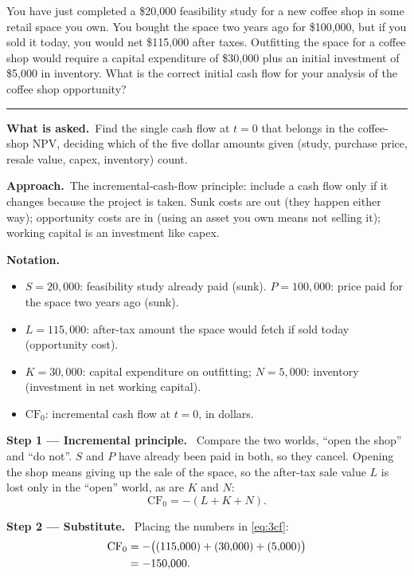 \documentclass[11pt,a4paper]{article}
\numberwithin{equation}{section}
\newcommand{\step}[2]{\par\medskip\noindent\textbf{Step #1 --- #2.}~}
\newenvironment{notation}{\par\noindent\textbf{Notation.}\begin{itemize}[leftmargin=1.4em]}{\end{itemize}}
\newcommand{\asked}{\par\medskip\noindent\textbf{What is asked.}~}
\newcommand{\approach}{\par\smallskip\noindent\textbf{Approach.}~}
\newcommand{\stmtend}{\par\endgroup\nopagebreak\noindent\rule{\linewidth}{0.4pt}\par\medskip}
\begin{document}
You have just completed a \$20,000 feasibility study for a new coffee shop in some retail space you
own. You bought the space two years ago for \$100,000, but if you sold it today, you would net
\$115,000 after taxes. Outfitting the space for a coffee shop would require a capital expenditure of
\$30,000 plus an initial investment of \$5,000 in inventory. What is the correct initial cash flow
for your analysis of the coffee shop opportunity?
\stmtend

\asked Find the single cash flow at $t=0$ that belongs in the coffee-shop NPV, deciding which of
the five dollar amounts given (study, purchase price, resale value, capex, inventory) count.

\approach The incremental-cash-flow principle: include a cash flow only if it changes because
the project is taken. Sunk costs are out (they happen either way); opportunity costs are in
(using an asset you own means not selling it); working capital is an investment like capex.

\begin{notation}
  \item $S=20{,}000$: feasibility study already paid (sunk). $P=100{,}000$: price paid for the space two years ago (sunk).
  \item $L=115{,}000$: after-tax amount the space would fetch if sold today (opportunity cost).
  \item $K=30{,}000$: capital expenditure on outfitting; $N=5{,}000$: inventory (investment in net working capital).
  \item $\mathrm{CF}_0$: incremental cash flow at $t=0$, in dollars.
\end{notation}

\step{1}{Incremental principle} Compare the two worlds, ``open the shop'' and ``do not''. $S$ and
$P$ have already been paid in both, so they cancel. Opening the shop means giving up the sale of
the space, so the after-tax sale value $L$ is lost only in the ``open'' world, as are $K$ and $N$:
\begin{equation}\label{eq:3cf}
  \mathrm{CF}_0 = -(L + K + N).
\end{equation}

\step{2}{Substitute} Placing the numbers in \eqref{eq:3cf}:
\begin{align}
  \mathrm{CF}_0 &= -\big((115{,}000) + (30{,}000) + (5{,}000)\big) \notag\\
                &= -150{,}000. \label{eq:3res}
\end{align}
\end{document}
